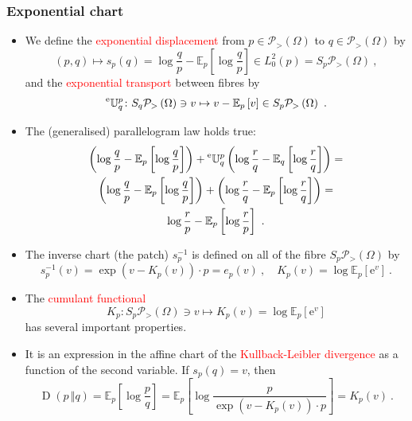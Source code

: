 \documentclass[xcolor=svgnames]{beamer}
\newcommand{\KL}[2]{\operatorname{D}\left(#1\,\Vert#2\right)}
\newcommand{\etransport}[2]{\prescript{\text{e}}{} {\mathbb U} _ {#1} ^ {#2}}
\newcommand{\euler}{\mathrm{e}}
\newcommand{\expectat}[2]{\mathbb E_{#1}\left[#2\right]}
\newcommand{\expfibreat}[2]{S_{#1}#2}
\newcommand{\expof}[1]{\exp\left(#1\right)}
\newcommand{\opensimplexon}[1]{\mathcal P_>\left(#1\right)}
\newcommand{\rosso}[1]{\textcolor{red}{#1}}
\renewcommand{\emph}{\rosso}
\begin{document}
\begin{frame}\small\frametitle{Exponential chart}

  \begin{itemize}

   \item We define the \emph{exponential displacement} from $p \in \opensimplexon \Omega$ to $q \in \opensimplexon \Omega$ by
    \begin{equation*}
(p,q) \mapsto s_p(q) = \log \frac q  p - \expectat p {\log \frac q p} \in L^2_0(p) = \expfibreat p {\opensimplexon \Omega} \ ,
    \end{equation*}
    and the \emph{exponential transport} between fibres  by
    \begin{equation*}
      \etransport q p \colon \expfibreat q {\opensimplexon \Omega} \ni v \mapsto v - \expectat p v \in \expfibreat p {\opensimplexon \Omega} \ .
    \end{equation*}
\item The (generalised) parallelogram law holds true:
    \begin{multline*}
      \left(\log \frac q p - \expectat p {\log \frac q p}\right) + \etransport q p \left(\log \frac r q - \expectat q {\log \frac r q}\right) = \\   \left(\log \frac q p - \expectat p {\log \frac q p}\right) + \left(\log \frac r q - \expectat p {\log \frac r q}\right) = \\ \log \frac r p - \expectat p {\log \frac r p} \ . 
    \end{multline*}
\item The inverse chart (the patch) $s_p^{-1}$ is defined on all of the fibre $\expfibreat p {\opensimplexon \Omega}$ by
  \begin{equation*}
    s^{-1}_p(v) = \expof{v - K_p(v)} \cdot p = e_p(v) \ , \quad K_p(v) = \log \expectat p {\euler^v} \ .
  \end{equation*}
\item The \emph{cumulant functional}
\begin{equation*}
   K_p \colon \expfibreat p {\opensimplexon \Omega} \ni v \mapsto K_p(v) = \log \expectat p {\euler^v}
 \end{equation*}
 has several important properties.
 \item It is an expression in the affine chart of the \emph{Kullback-Leibler divergence} as a function of the second variable. If $s_p(q) = v$, then
\begin{equation*}
    \KL p q = \expectat p {\log \frac p q} = \expectat p {\log \frac p {\expof{v - K_p(v)} \cdot p}} = K_p(v) \ .
\end{equation*}
\end{itemize}
\end{frame}
\end{document}
